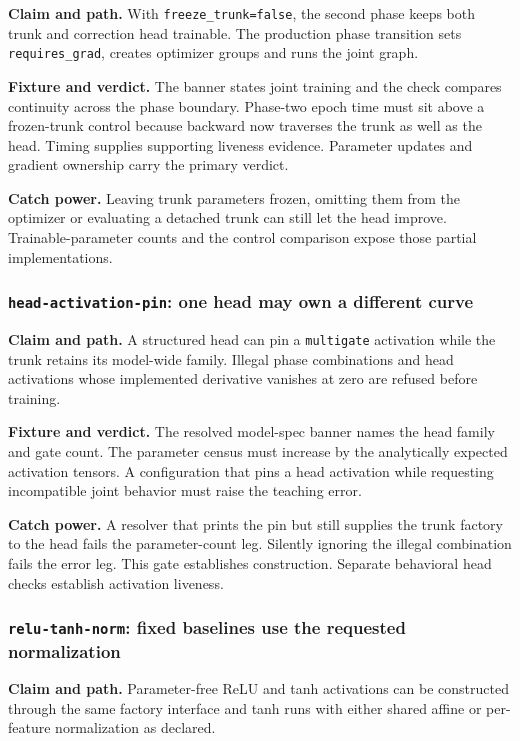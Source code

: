 \documentclass[10pt,aps,prd,twocolumn,nofootinbib]{revtex4-2}
\newcommand{\code}[1]{\texttt{#1}}
\begin{document}
\textbf{Claim and path.}  With \code{freeze\_trunk=false}, the second phase
keeps both trunk and correction head trainable.  The production phase
transition sets \code{requires\_grad}, creates optimizer groups and runs the
joint graph.

\textbf{Fixture and verdict.}  The banner states joint training and the check
compares continuity across the phase boundary.  Phase-two epoch time must sit
above a frozen-trunk control because backward now traverses the trunk as well
as the head.  Timing supplies supporting liveness evidence.  Parameter updates
and gradient ownership carry the primary verdict.

\textbf{Catch power.}  Leaving trunk parameters frozen, omitting them from the
optimizer or evaluating a detached trunk can still let the head improve.
Trainable-parameter counts and the control comparison expose those partial
implementations.

\subsubsection{\code{head-activation-pin}: one head may own a different curve}

\textbf{Claim and path.}  A structured head can pin a \code{multigate}
activation while the trunk retains its model-wide family.  Illegal phase
combinations and head activations whose implemented derivative vanishes at
zero are refused before training.

\textbf{Fixture and verdict.}  The resolved model-spec banner names the head
family and gate count.  The parameter census must increase by the analytically
expected activation tensors.  A configuration that pins a head activation
while requesting incompatible joint behavior must raise the teaching error.

\textbf{Catch power.}  A resolver that prints the pin but still supplies the
trunk factory to the head fails the parameter-count leg.  Silently ignoring
the illegal combination fails the error leg.  This gate establishes
construction.  Separate behavioral head checks establish activation liveness.

\subsubsection{\code{relu-tanh-norm}: fixed baselines use the requested normalization}

\textbf{Claim and path.}  Parameter-free ReLU and tanh activations can be
constructed through the same factory interface and tanh runs with either
shared affine or per-feature normalization as declared.
\end{document}
